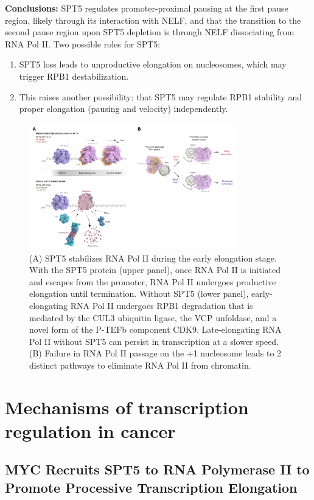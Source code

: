 \textbf{Conclusions:}
SPT5 regulates promoter-proximal pausing at the first pause region, likely through its interaction with NELF, and that the transition to the second pause region upon SPT5 depletion is through NELF dissociating from RNA Pol II.
Two possible roles for SPT5:
\begin{enumerate}
\tightlist
\item SPT5 loss leads to unproductive elongation on nucleosomes, which may trigger RPB1 destabilization.
\item This raises another possibility: that SPT5 may regulate RPB1 stability and
proper elongation (pausing and velocity) independently.
\end{enumerate}

\begin{figure}
\centering
\includegraphics[width=0.8\textwidth]{../_resources/Screen_Shot_2022-12-19_at_17-00-41.png}
\caption{(A) SPT5 stabilizes RNA Pol II during the early elongation stage. With the SPT5 protein (upper panel), once RNA Pol II is initiated and escapes from the promoter, RNA Pol II undergoes productive elongation until termination. Without SPT5 (lower panel), early-elongating RNA Pol II undergoes RPB1 degradation that is mediated by the CUL3 ubiquitin ligase, the VCP unfoldase, and a novel form of the P-TEFb component CDK9. Late-elongating RNA Pol II without SPT5 can persist in transcription at a slower speed.
(B) Failure in RNA Pol II passage on the +1 nucleosome leads to 2 distinct pathways to eliminate RNA Pol II from chromatin.}
\end{figure}

\section{Mechanisms of transcription regulation in cancer}

\subsection{MYC Recruits SPT5 to RNA Polymerase II to Promote Processive Transcription Elongation}

